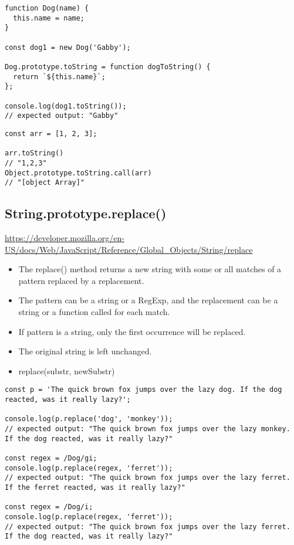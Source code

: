 \documentclass[10pt]{article}
\begin{document}
\begin{lstlisting}[title=Example toString(), captionpos=t]
function Dog(name) {
  this.name = name;
}

const dog1 = new Dog('Gabby');

Dog.prototype.toString = function dogToString() {
  return `${this.name}`;
};

console.log(dog1.toString());
// expected output: "Gabby"
\end{lstlisting}


\begin{lstlisting}[title=Example toString(), captionpos=t]
const arr = [1, 2, 3];

arr.toString() 
// "1,2,3"
Object.prototype.toString.call(arr) 
// "[object Array]"
\end{lstlisting}

\medskip %









\medskip %
\pagebreak
\subsection{String.prototype.replace()}

\url{https://developer.mozilla.org/en-US/docs/Web/JavaScript/Reference/Global_Objects/String/replace}

\begin{itemize}
	\item The replace() method returns a new string with some or all matches of a pattern replaced by a replacement. 
	\item  The pattern can be a string or a RegExp, and the replacement can be a string or a function called for each match.
	\item If pattern is a string, only the first occurrence will be replaced.
	\item The original string is left unchanged.
	\item replace(substr, newSubstr)

\end{itemize}

\begin{lstlisting}[title=Example replace(), captionpos=t]
const p = 'The quick brown fox jumps over the lazy dog. If the dog reacted, was it really lazy?';

console.log(p.replace('dog', 'monkey'));
// expected output: "The quick brown fox jumps over the lazy monkey. If the dog reacted, was it really lazy?"

const regex = /Dog/gi;
console.log(p.replace(regex, 'ferret'));
// expected output: "The quick brown fox jumps over the lazy ferret. If the ferret reacted, was it really lazy?"

const regex = /Dog/i;
console.log(p.replace(regex, 'ferret'));
// expected output: "The quick brown fox jumps over the lazy ferret. If the dog reacted, was it really lazy?"
\end{lstlisting}
\end{document}
